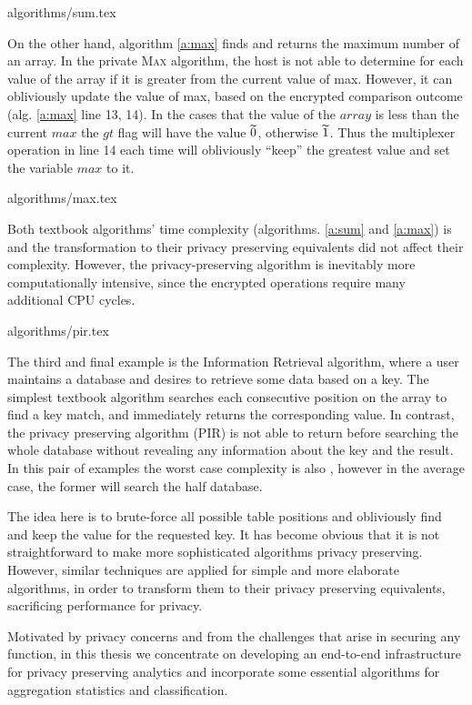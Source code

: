 {algorithms/sum.tex}


On the other hand, algorithm \ref{a:max} finds and returns the maximum number of an array.
In the private {\textsc{Max}} algorithm, the host is not able to determine for each value of the array if it is greater from the current value of max.
However, it can obliviously update the value of max, based on the encrypted comparison outcome (alg. \ref{a:max} line 13, 14).
In the cases that the value of the $array$ is less than the current $max$ the $gt$ flag will have the value $\widetilde{0}$, otherwise $\widetilde{1}$.
Thus the multiplexer operation in line 14 each time will obliviously ``keep'' the greatest value and set the variable $max$ to it.

{algorithms/max.tex}

Both textbook algorithms' time complexity (algorithms. \ref{a:sum} and \ref{a:max}) is  and the transformation to their privacy preserving equivalents did not affect their complexity.
However, the privacy\hyp preserving algorithm is inevitably more computationally intensive, since the encrypted operations require many additional CPU cycles.


{algorithms/pir.tex}

The third and final example is the Information Retrieval algorithm, where a user maintains a database and desires to retrieve some data based on a key.
The simplest textbook algorithm searches each consecutive position on the array to find a key match, and immediately returns the corresponding value.
In contrast, the privacy preserving algorithm (PIR) \cite{chor1995private} is not able to return before searching the whole database without revealing any information about the key and the result.
In this pair of examples the worst case complexity is also , however in the average case, the former will search the half database.

The idea here is to brute\hyp force all possible table positions and obliviously find and keep the value for the requested key.
It has become obvious that it is not straightforward to make more sophisticated algorithms privacy preserving.
However, similar techniques are applied for simple and more elaborate algorithms, in order to transform them to their privacy preserving equivalents, sacrificing performance for privacy.

Motivated by privacy concerns and from the challenges that arise in securing any function, in this thesis we concentrate on developing an end-to-end infrastructure for privacy preserving analytics and incorporate some essential algorithms for aggregation statistics and classification.




